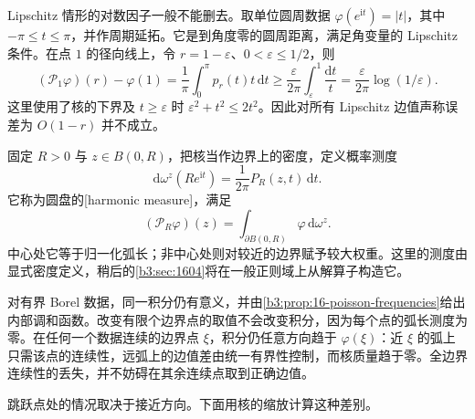 Lipschitz 情形的对数因子一般不能删去。取单位圆周数据
\(\varphi(e^{\mathrm i t})=|t|\)，其中 \(-\pi\le t\le\pi\)，并作周期延拓。它是到角度零的圆周距离，满足角变量的 Lipschitz 条件。在点 \(1\) 的径向线上，令 \(r=1-\varepsilon\)、\(0<\varepsilon\le1/2\)，则
\[
 (\mathcal P_1\varphi)(r)-\varphi(1)
 =\frac1\pi\int_0^\pi p_r(t)t\,\mathrm dt
 \ge\frac{\varepsilon}{2\pi}
       \int_\varepsilon^1\frac{\mathrm dt}{t}
 =\frac{\varepsilon}{2\pi}\log(1/\varepsilon).
\]
这里使用了核的下界及 \(t\ge\varepsilon\) 时
\(\varepsilon^2+t^2\le2t^2\)。因此对所有 Lipschitz 边值声称误差为 \(O(1-r)\) 并不成立。

\ProseParagraphBreak
固定 \(R>0\) 与 \(z\in B(0,R)\)，把核当作边界上的密度，定义概率测度
\[
 \mathrm d\omega^z(Re^{\mathrm i t})
 =\frac1{2\pi}P_R(z,t)\,\mathrm dt.
\]
它称为圆盘的[harmonic measure]，满足
\[
 (\mathcal P_R\varphi)(z)=\int_{\partial B(0,R)}\varphi\,\mathrm d\omega^z.
\]
中心处它等于归一化弧长；非中心处则对较近的边界赋予较大权重。这里的测度由显式密度定义，稍后的\cref{b3:sec:1604}将在一般正则域上从解算子构造它。

\ProseParagraphBreak
对有界 Borel 数据，同一积分仍有意义，并由\cref{b3:prop:16-poisson-frequencies}给出内部调和函数。改变有限个边界点的取值不会改变积分，因为每个点的弧长测度为零。在任何一个数据连续的边界点 \(\xi\)，积分仍任意方向趋于 \(\varphi(\xi)\)：近 \(\xi\) 的弧上只需该点的连续性，远弧上的边值差由统一有界性控制，而核质量趋于零。全边界连续性的丢失，并不妨碍在其余连续点取到正确边值。

\ProseParagraphBreak
跳跃点处的情况取决于接近方向。下面用核的缩放计算这种差别。

